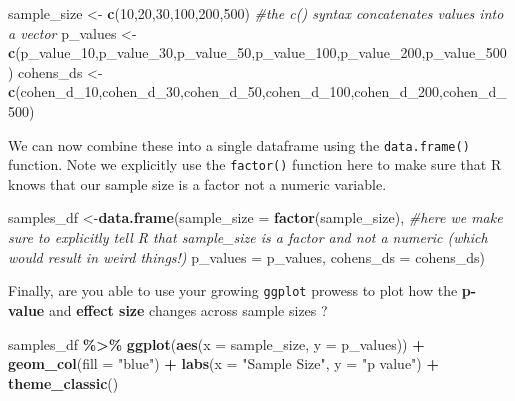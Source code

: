 \documentclass[
]{book}
\newenvironment{Shaded}{\begin{snugshade}}{\end{snugshade}}
\newcommand{\AttributeTok}[1]{\textcolor[rgb]{0.13,0.29,0.53}{#1}}
\newcommand{\CommentTok}[1]{\textcolor[rgb]{0.56,0.35,0.01}{\textit{#1}}}
\newcommand{\DecValTok}[1]{\textcolor[rgb]{0.00,0.00,0.81}{#1}}
\newcommand{\FunctionTok}[1]{\textcolor[rgb]{0.13,0.29,0.53}{\textbf{#1}}}
\newcommand{\NormalTok}[1]{#1}
\newcommand{\OtherTok}[1]{\textcolor[rgb]{0.56,0.35,0.01}{#1}}
\newcommand{\SpecialCharTok}[1]{\textcolor[rgb]{0.81,0.36,0.00}{\textbf{#1}}}
\newcommand{\StringTok}[1]{\textcolor[rgb]{0.31,0.60,0.02}{#1}}
\begin{document}
\begin{Shaded}
\begin{Highlighting}[]
\NormalTok{sample\_size }\OtherTok{\textless{}{-}} \FunctionTok{c}\NormalTok{(}\DecValTok{10}\NormalTok{,}\DecValTok{20}\NormalTok{,}\DecValTok{30}\NormalTok{,}\DecValTok{100}\NormalTok{,}\DecValTok{200}\NormalTok{,}\DecValTok{500}\NormalTok{) }\CommentTok{\#the c() syntax concatenates values into a vector}
\NormalTok{p\_values }\OtherTok{\textless{}{-}} \FunctionTok{c}\NormalTok{(p\_value\_10,p\_value\_30,p\_value\_50,p\_value\_100,p\_value\_200,p\_value\_500)}
\NormalTok{cohens\_ds }\OtherTok{\textless{}{-}} \FunctionTok{c}\NormalTok{(cohen\_d\_10,cohen\_d\_30,cohen\_d\_50,cohen\_d\_100,cohen\_d\_200,cohen\_d\_500)}
\end{Highlighting}
\end{Shaded}

We can now combine these into a single dataframe using the \texttt{data.frame()} function. Note we explicitly use the \texttt{factor()} function here to make sure that R knows that our sample size is a factor not a numeric variable.

\begin{Shaded}
\begin{Highlighting}[]
\NormalTok{samples\_df }\OtherTok{\textless{}{-}}\FunctionTok{data.frame}\NormalTok{(}\AttributeTok{sample\_size =} \FunctionTok{factor}\NormalTok{(sample\_size), }\CommentTok{\#here we make sure to explicitly tell R that sample\_size is a factor and not a numeric (which would result in weird things!)}
              \AttributeTok{p\_values =}\NormalTok{ p\_values,}
              \AttributeTok{cohens\_ds =}\NormalTok{ cohens\_ds)}
\end{Highlighting}
\end{Shaded}

Finally, are you able to use your growing \texttt{ggplot} prowess to plot how the \textbf{p-value} and \textbf{effect size} changes across sample sizes ?

\begin{Shaded}
\begin{Highlighting}[]
\NormalTok{samples\_df }\SpecialCharTok{\%\textgreater{}\%} 
  \FunctionTok{ggplot}\NormalTok{(}\FunctionTok{aes}\NormalTok{(}\AttributeTok{x =}\NormalTok{ sample\_size, }\AttributeTok{y =}\NormalTok{ p\_values)) }\SpecialCharTok{+}
  \FunctionTok{geom\_col}\NormalTok{(}\AttributeTok{fill =} \StringTok{"blue"}\NormalTok{) }\SpecialCharTok{+}
  \FunctionTok{labs}\NormalTok{(}\AttributeTok{x =} \StringTok{"Sample Size"}\NormalTok{, }\AttributeTok{y =} \StringTok{"p value"}\NormalTok{) }\SpecialCharTok{+}
  \FunctionTok{theme\_classic}\NormalTok{()}
\end{Highlighting}
\end{Shaded}
\end{document}
